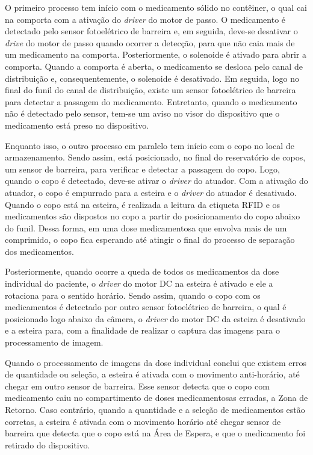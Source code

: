 O primeiro processo tem início com o medicamento sólido no contêiner, o qual cai na comporta com a ativação do \textit{driver} do motor de passo. O medicamento é detectado pelo sensor fotoelétrico de barreira e, em seguida, deve-se desativar o \textit{drive} do motor de passo quando ocorrer a detecção, para que não caia mais de um medicamento na comporta. Posteriormente, o solenoide é ativado para abrir a comporta. Quando a comporta é aberta, o medicamento se desloca pelo canal de distribuição e, consequentemente, o solenoide é desativado. Em seguida, logo no final do funil do canal de distribuição, existe um sensor fotoelétrico de barreira para detectar a passagem do medicamento. Entretanto, quando o medicamento não é detectado pelo sensor, tem-se um aviso no visor do dispositivo que o medicamento está preso no dispositivo.

Enquanto isso, o outro processo em paralelo tem início com o copo no local de armazenamento. Sendo assim, está posicionado, no final do reservatório de copos, um sensor de barreira, para verificar e detectar a passagem do copo. Logo, quando o copo é detectado, deve-se ativar o \textit{driver} do atuador. Com a ativação do atuador, o copo é empurrado para a esteira e o \textit{driver} do atuador é desativado. Quando o copo está na esteira, é realizada a leitura da etiqueta RFID e os medicamentos são dispostos no copo a partir do posicionamento do copo abaixo do funil. Dessa forma, em uma dose medicamentosa que envolva mais de um comprimido, o copo fica esperando até atingir o final do processo de separação dos medicamentos.

Posteriormente, quando ocorre a queda de todos os medicamentos da dose individual do paciente, o \textit{driver} do motor DC na esteira é ativado e ele a rotaciona para o sentido horário. Sendo assim, quando o copo com os medicamentos é detectado por outro sensor fotoelétrico de barreira, o qual é posicionado logo abaixo da câmera, o \textit{driver} do motor DC da esteira é desativado e a esteira para, com a finalidade de realizar o captura das imagens para o processamento de imagem. 

Quando o processamento de imagens da dose individual conclui que existem erros de quantidade ou seleção, a esteira é ativada com o movimento anti-horário, até chegar em outro sensor de barreira. Esse sensor detecta que o copo com medicamento caiu no compartimento de doses medicamentosas erradas, a Zona de Retorno. Caso contrário, quando a quantidade e a seleção de medicamentos estão corretas, a esteira é ativada com o movimento horário até chegar sensor de barreira que detecta que o copo está na Área de Espera, e que o medicamento foi retirado do dispositivo. 

